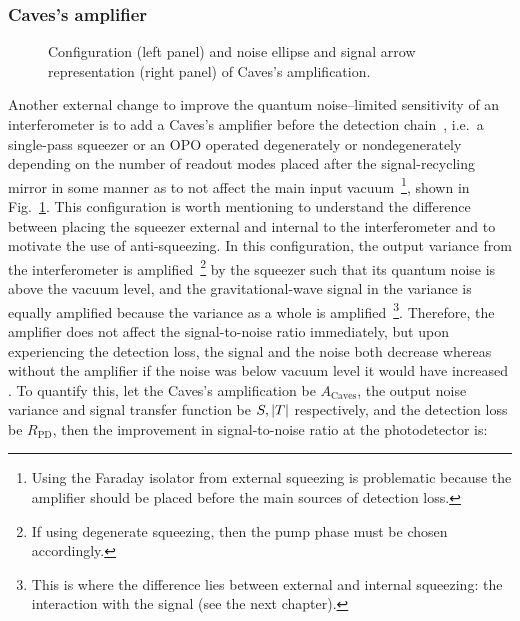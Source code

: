 \subsubsection{Caves's amplifier}

\begin{figure}
	\centering
	\caption{Configuration (left panel) and noise ellipse and signal arrow representation (right panel) of Caves's amplification.}
	\label{fig:Cavess_amplifier}
\end{figure}

Another external change to improve the quantum noise--limited sensitivity of an interferometer is to add a Caves's amplifier before the detection chain~\cite{}, i.e.\ a single-pass squeezer or an OPO  operated degenerately or nondegenerately depending on the number of readout modes placed after the signal-recycling mirror in some manner as to not affect the main input vacuum~\footnote{Using the Faraday isolator from external squeezing is problematic because the amplifier should be placed before the main sources of detection loss.}, shown in Fig.~\ref{fig:Cavess_amplifier}. This configuration is worth mentioning to understand the difference between placing the squeezer external and internal to the interferometer and to motivate the use of anti-squeezing. In this configuration, the output variance from the interferometer is amplified~\footnote{If using degenerate squeezing, then the pump phase must be chosen accordingly.} by the squeezer such that its quantum noise is above the vacuum level, and the gravitational-wave signal in the variance is equally amplified because the variance as a whole is amplified~\footnote{This is where the difference lies between external and internal squeezing: the interaction with the signal (see the next chapter).}. Therefore, the amplifier does not affect the signal-to-noise ratio immediately, but upon experiencing the detection loss, the signal and the noise both decrease whereas without the amplifier if the noise was below vacuum level it would have increased . To quantify this, let the Caves's amplification be $A_\text{Caves}$, the output noise variance and signal transfer function be $S, \abs{T}$ respectively, and the detection loss be $R_\text{PD}$, then the improvement in signal-to-noise ratio at the photodetector is:
